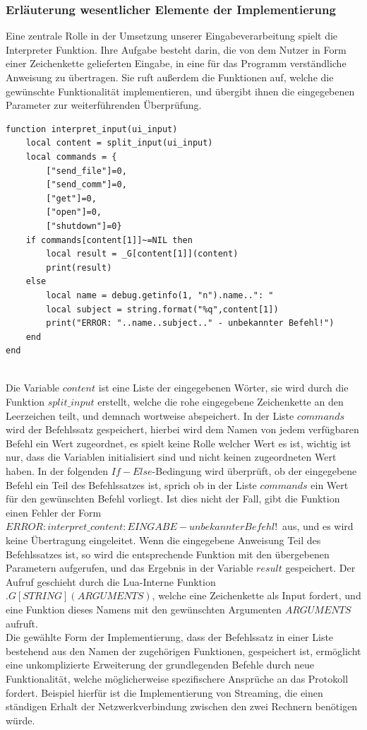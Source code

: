 \subsubsection{Erläuterung wesentlicher Elemente der Implementierung}
Eine zentrale Rolle in der Umsetzung unserer Eingabeverarbeitung spielt die Interpreter Funktion. Ihre Aufgabe besteht darin, die von dem Nutzer in Form einer Zeichenkette gelieferten Eingabe, in eine für das Programm verständliche Anweisung zu übertragen. Sie ruft außerdem die Funktionen auf, welche die gewünschte Funktionalität implementieren, und übergibt ihnen die eingegebenen Parameter zur weiterführenden Überprüfung.\\
\begin{lstlisting}[caption = {Interpreter Funktion}]
function interpret_input(ui_input)
    local content = split_input(ui_input)
    local commands = {
        ["send_file"]=0,
        ["send_comm"]=0,
        ["get"]=0,
        ["open"]=0,
        ["shutdown"]=0}
    if commands[content[1]]~=NIL then
        local result = _G[content[1]](content)
        print(result)
    else
        local name = debug.getinfo(1, "n").name..": "
        local subject = string.format("%q",content[1])
        print("ERROR: "..name..subject.." - unbekannter Befehl!")
    end
end
\end{lstlisting}\hfill\\
Die Variable $content$ ist eine Liste der eingegebenen Wörter, sie wird durch die Funktion $split\_input$ erstellt, welche die rohe eingegebene Zeichenkette an den Leerzeichen teilt, und demnach wortweise abspeichert. In der Liste $commands$ wird der Befehlssatz gespeichert, hierbei wird dem Namen von jedem verfügbaren Befehl ein Wert zugeordnet, es spielt keine Rolle welcher Wert es ist, wichtig ist nur, dass die Variablen initialisiert sind und nicht keinen zugeordneten Wert haben. In der folgenden $If-Else$-Bedingung wird überprüft, ob der eingegebene Befehl ein Teil des Befehlssatzes ist, sprich ob in der Liste $commands$ ein Wert für den gewünschten Befehl vorliegt. Ist dies nicht der Fall, gibt die Funktion einen Fehler der Form \glqq$ERROR: interpret\_content: EINGABE - unbekannter Befehl!$\grqq\ aus, und es wird keine Übertragung eingeleitet. Wenn die eingegebene Anweisung Teil des Befehlssatzes ist, so wird die entsprechende Funktion mit den übergebenen Parametern aufgerufen, und das Ergebnis in der Variable $result$ gespeichert. Der Aufruf geschieht durch die Lua-Interne Funktion $.G[STRING](ARGUMENTS)$, welche eine Zeichenkette als Input fordert, und eine Funktion dieses Namens mit den gewünschten Argumenten $ARGUMENTS$ aufruft.\\ Die gewählte Form der Implementierung, dass der Befehlssatz in einer Liste bestehend aus den Namen der zugehörigen Funktionen, gespeichert ist, ermöglicht eine unkomplizierte Erweiterung der grundlegenden Befehle durch neue Funktionalität, welche möglicherweise spezifischere Ansprüche an das Protokoll fordert. Beispiel hierfür ist die Implementierung von Streaming, die einen ständigen Erhalt der Netzwerkverbindung zwischen den zwei Rechnern benötigen würde. \\
